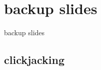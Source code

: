 \date{}
\title{}
\date{}
\usepackage[outputdir=latex.out]{minted}

\begin{frame}
    \titlepage
\end{frame}
\usetikzlibrary{arrows.meta,calc,shapes.callouts,positioning}




\section{backup slides}
\begin{frame}{backup slides}
\end{frame}





\subsection{clickjacking}



